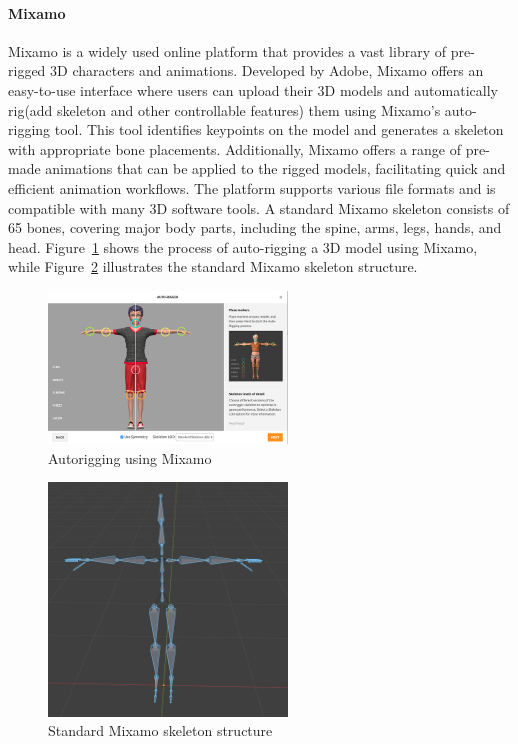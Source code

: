 \documentclass[../../main.tex]{subfiles}
\begin{document}
\paragraph{Mixamo}
\label{ch:background_work:sign_language_synthesis:3d_techniques:skeleton:mixamo}

Mixamo is a widely used online platform that provides a vast library of pre-rigged 3D characters and animations. Developed by Adobe, Mixamo offers an easy-to-use interface where users can upload their 3D models and automatically rig(add skeleton and other controllable features) them using Mixamo's auto-rigging tool. This tool identifies keypoints on the model and generates a skeleton with appropriate bone placements. Additionally, Mixamo offers a range of pre-made animations that can be applied to the rigged models, facilitating quick and efficient animation workflows. The platform supports various file formats and is compatible with many 3D software tools. A standard Mixamo skeleton consists of 65 bones, covering major body parts, including the spine, arms, legs, hands, and head. Figure~\ref{fig:mixamo_autorigging} shows the process of auto-rigging a 3D model using Mixamo, while Figure~\ref{fig:mixamo_skeleton} illustrates the standard Mixamo skeleton structure.

\begin{figure} 
  \centering \includegraphics[width = 2.5in]{chapters/background_work/images/mixamo_autorigging.png} 
  \caption{Autorigging using Mixamo} 
  \label{fig:mixamo_autorigging} 
\end{figure}

\begin{figure} 
  \centering \includegraphics[width = 2.5in]{chapters/background_work/images/mixamo_skeleton.png} 
  \caption{Standard Mixamo skeleton structure} 
  \label{fig:mixamo_skeleton} 
\end{figure}
\end{document}
